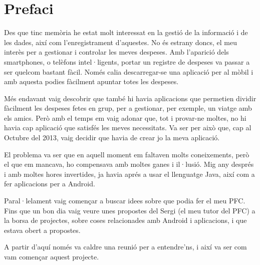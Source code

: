\chapter{Prefaci} \label{Prefaci}

Des que tinc memòria he estat molt interessat en la gestió de la informació i de les dades, així com l'enregistrament d'aquestes. No és estrany doncs, el meu interès per a gestionar i controlar les meves despeses. Amb l'aparició dels \glspl{smartphone}, o telèfons intel·ligents, portar un registre de despeses va passar a ser quelcom bastant fàcil. Només calia descarregar-se una aplicació per al mòbil i amb aquesta podies fàcilment apuntar totes les despeses. 

Més endavant vaig descobrir que també hi havia aplicacions que permetien dividir fàcilment les despeses fetes en grup, per a gestionar, per exemple, un viatge amb els amics. Però amb el temps em vaig adonar que, tot i provar-ne moltes, no hi havia cap aplicació que satisfés les meves necessitats. Va ser per això que, cap al Octubre del 2013, vaig decidir que havia de crear jo la meva aplicació.

El problema va ser que en aquell moment em faltaven molts coneixements, però el que em mancava, ho compensava amb moltes ganes i il·lusió. Mig any després i amb moltes hores invertides, ja havia aprés a usar el llenguatge Java, així com a fer aplicacions per a \gls{Android}. 

Paral·lelament vaig començar a buscar idees sobre que podia fer el meu \ac{PFC}. Fins que un bon dia vaig veure unes propostes del Sergi (el meu tutor del \ac{PFC}) a la borsa de projectes, sobre coses relacionades amb \gls{Android} i aplicacions, i que estava obert a propostes. 

A partir d'aquí només va caldre una reunió per a entendre'ns, i així va ser com vam començar aquest projecte. 



